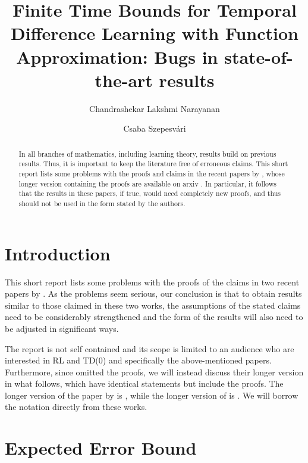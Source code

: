 \documentclass{article}
\title{Finite Time Bounds for Temporal Difference Learning with Function Approximation: Bugs in state-of-the-art results}
\author{
Chandrashekar Lakshmi Narayanan
\and
Csaba Szepesv\'ari 
}
\begin{document}

\maketitle
\begin{abstract}
In all branches of mathematics, including learning theory,
results build on previous results. Thus, it is important to keep the literature free of erroneous claims.
This short report lists some problems with the proofs and claims in the recent papers by \cite{flstd,lstdicml}, whose longer version containing the proofs are available on arxiv \citep{flstda,lstdicmla}. 
In particular, it follows that the results in these papers, if true, would need completely new proofs, and thus should not be used in the form stated by the authors.
\end{abstract}
\section{Introduction}
This short report lists some problems with the proofs of the claims in two recent papers  by \cite{flstd,lstdicml}.
As the problems seem serious, our conclusion is that to obtain results similar to those claimed in these two works, the assumptions of the stated claims need to be considerably strengthened and the form of the results will also need to be adjusted in significant ways.

The report is not self contained and its scope is limited to an audience who are interested in RL and TD(0) and specifically the above-mentioned papers.
Furthermore, since \cite{flstd,lstdicml} omitted the proofs, we will instead discuss their longer version in what follows, which have identical statements but include the proofs. The longer version of the paper by \cite{flstd} is \citep{flstda}, while the longer version
of \cite{lstdicml} is \citep{lstdicmla}.
We will  borrow the notation directly from these works.

\section{Expected Error Bound}
\end{document}
